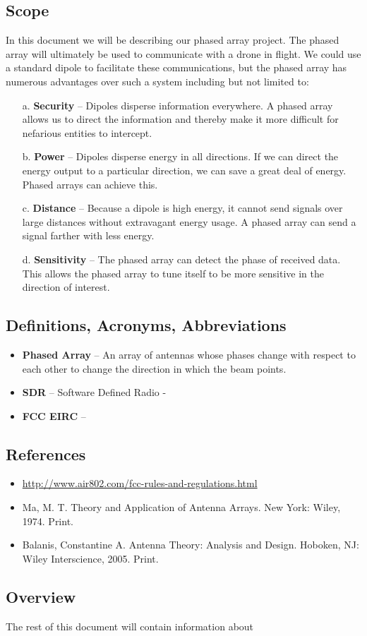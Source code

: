 \documentclass[ProjectRequirements.tex]{subfiles}
\begin{document}
	\subsection{Scope}
	In this document we will be describing our phased array project. The phased array will ultimately be used to communicate with a drone in flight. We could use a standard dipole to facilitate these communications, but the phased array has numerous advantages over such a system including but not limited to:
	\begin{itemize} \itemsep1pt
		\item[a.]	\textbf{Security} -- Dipoles disperse information everywhere. A phased array allows us to direct the information and thereby make it more difficult for nefarious entities to intercept.
		\item[b.] 	\textbf{Power} -- Dipoles disperse energy in all directions. If we can direct the energy output to a particular direction, we can save a great deal of energy. Phased arrays can achieve this.
		\item[c.] 	\textbf{Distance} -- Because a dipole is high energy, it cannot send signals over large distances without extravagant energy usage. A phased array can send a signal farther with less energy.
			\item[d.] 	\textbf{Sensitivity} -- The phased array can detect the phase of received data. This allows the phased array to tune itself to be more sensitive in the direction of interest.
	\end{itemize}
	\subsection{Definitions, Acronyms, Abbreviations}
		\begin{itemize}
			\item \textbf{Phased Array} -- An array of antennas whose phases change with respect to each other to change the direction in which the beam points.
			\item \textbf{SDR} -- Software Defined Radio -
			\item \textbf{FCC EIRC} -- 
		\end{itemize}
	\subsection{References}
		\begin{itemize}
			\item \url{http://www.air802.com/fcc-rules-and-regulations.html}
			\item Ma, M. T. Theory and Application of Antenna Arrays. New York: Wiley, 1974. Print.
			\item Balanis, Constantine A. Antenna Theory: Analysis and Design. Hoboken, NJ: Wiley Interscience, 2005. Print.
		\end{itemize}
	\subsection{Overview}
		The rest of this document will contain information about 
\end{document}
